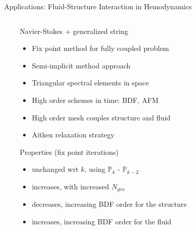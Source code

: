 \documentclass[final,utf8,,hyperref={pdfpagelabels=false}]{beamer}
\begin{document}
\begin{frame}[containsverbatim]{}
\begin{columns}[c]
\begin{block}{Applications: Fluid-Structure Interaction in Hemodynamics}
\begin{columns}[t]
\begin{column}{.40\textwidth}
      \end{column}
      \begin{column}{.56\textwidth}
          \begin{block}{Navier-Stokes + generalized string}
	    \begin{itemize}
	      \item Fix point method for fully coupled problem
	      \item Semi-implicit method approach
	      \item Triangular spectral elements in space
	      \item High order schemes in time: BDF, AFM
	      \item High order mesh couples structure and fluid
	      \item Aitken relaxation strategy
	    \end{itemize}
	  \end{block}
	  \begin{block}{Properties (fix point iterations)}
	    \begin{itemize}
	      \item unchanged wrt $k$, using $\mathbb P_k$ - $\mathbb P_{k-2}$
	      \item increases, with increased $N_{geo}$
	      \item decreases, increasing  BDF order for the structure
	      \item increases, increasing BDF order for the fluid
	    \end{itemize}
	  \end{block}
        \end{column}
      \end{columns}

  \end{block}

  \end{columns}
  
  \end{frame}





  
\end{document}
